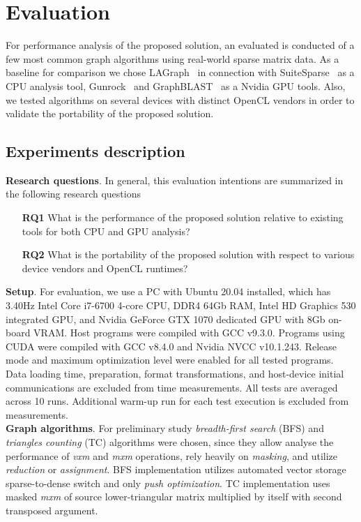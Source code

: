 \section{Evaluation}

For performance analysis of the proposed solution, an evaluated is conducted of a few most common graph algorithms using real-world sparse matrix data. As a baseline for comparison we chose LAGraph~\cite{misc:la_graph} in connection with SuiteSparse~\cite{article:suite_sparse_for_graph_problems} as a CPU analysis tool, Gunrock~\cite{article:gunrock} and GraphBLAST~\cite{yang2019graphblast} as a Nvidia GPU tools. Also, we tested algorithms on several devices with distinct OpenCL vendors in order to validate the portability of the proposed solution. 

\subsection{Experiments description}

\textbf{Research questions}. In general, this evaluation intentions are summarized in the following research questions

\begin{itemize}
    \item[\textbf{RQ1}] What is the performance of the proposed solution relative to existing tools for both CPU and GPU analysis?
    
    \item[\textbf{RQ2}] What is the portability of the proposed solution with respect to various device vendors and OpenCL runtimes?
\end{itemize}

\textbf{Setup}. For evaluation, we use a PC with Ubuntu 20.04 installed, which has 3.40Hz Intel Core i7-6700 4-core CPU, DDR4 64Gb RAM, Intel HD Graphics 530 integrated GPU, and Nvidia GeForce GTX 1070 dedicated GPU with 8Gb on-board VRAM. Host programs were compiled with GCC v9.3.0. Programs using CUDA were compiled with GCC v8.4.0 and Nvidia NVCC v10.1.243. Release mode and maximum optimization level were enabled for all tested programs. Data loading time, preparation, format transformations, and host-device initial communications are excluded from time measurements. All tests are averaged across 10 runs. Additional warm-up run for each test execution is excluded from measurements.\\

\textbf{Graph algorithms}. For preliminary study \textit{breadth-first search} (BFS) and \textit{triangles counting} (TC) algorithms were chosen, since they allow analyse the performance of \textit{vxm} and \textit{mxm} operations, rely heavily on \textit{masking}, and utilize \textit{reduction} or \textit{assignment}. BFS implementation utilizes automated vector storage sparse-to-dense switch and only \textit{push optimization}. TC implementation uses masked \textit{mxm} of source lower-triangular matrix multiplied by itself with second transposed argument.\\

